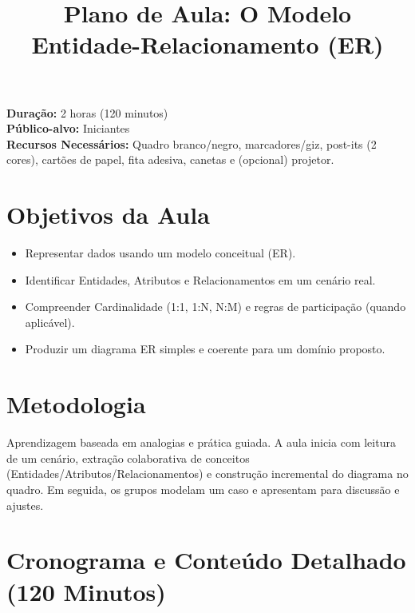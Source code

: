 \documentclass[12pt,a4paper]{article}
\title{Plano de Aula: O Modelo Entidade-Relacionamento (ER)}
\date{}
\begin{document}
\maketitle

\noindent
\textbf{Duração:} 2 horas (120 minutos)\\
\textbf{Público-alvo:} Iniciantes\\
\textbf{Recursos Necessários:} Quadro branco/negro, marcadores/giz, post-its (2 cores), cartões de papel, fita adesiva, canetas e (opcional) projetor.

\section{Objetivos da Aula}
\begin{itemize}[leftmargin=*,itemsep=0.25em]
  \item Representar dados usando um modelo conceitual (ER).
  \item Identificar Entidades, Atributos e Relacionamentos em um cenário real.
  \item Compreender Cardinalidade (1:1, 1:N, N:M) e regras de participação (quando aplicável).
  \item Produzir um diagrama ER simples e coerente para um domínio proposto.
\end{itemize}

\section{Metodologia}
Aprendizagem baseada em analogias e prática guiada. A aula inicia com leitura de um cenário, extração colaborativa de conceitos (Entidades/Atributos/Relacionamentos) e construção incremental do diagrama no quadro. Em seguida, os grupos modelam um caso e apresentam para discussão e ajustes.

\section{Cronograma e Conteúdo Detalhado (120 Minutos)}
\end{document}
